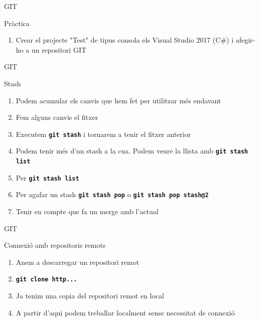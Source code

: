 \documentclass[10pt,xcolor={rgb}]{beamer}
\begin{document}
    \begin{frame}[fragile]{GIT}
      \begin{block}{Pràctica}

        \begin{enumerate}
          \item Crear el projecte "Test" de tipus consola els Visual Studio 2017 (C\#) i afegir-ho a un repositori GIT
        \end{enumerate}

      \end{block}
    \end{frame}

    \begin{frame}[fragile]{GIT}
      \begin{block}{Stash}

        \begin{enumerate}
          \item Podem acumular els canvis que hem fet per utilitzar més endavant
          \item Fem alguns canvis el fitxer
          \item Executem \texttt{\textbf{git stash}} i tornarem a tenir el fitxer anterior
          \item Podem tenir més d'un stash a la cua.  Podem veure la llista amb \texttt{\textbf{git stash list}}
          \item Per \texttt{\textbf{git stash list}}
          \item Per agafar un stash \texttt{\textbf{git stash pop}} o \texttt{\textbf{git stash pop stash@{2}}}
          \item Tenir en compte que fa un merge amb l'actual
        \end{enumerate}

      \end{block}
    \end{frame}


    \begin{frame}[fragile]{GIT}
      \begin{block}{Connexió amb repositoris remots}

        \begin{enumerate}
          \item Anem a descarregar un repositori remot
          \item \texttt{\textbf{git clone http...}}
          \item Ja tenim una copia del repositori remot en local
          \item A partir d'aqui podem treballar localment sense necessitat de connexió
        \end{enumerate}

      \end{block}
    \end{frame}
\end{document}
